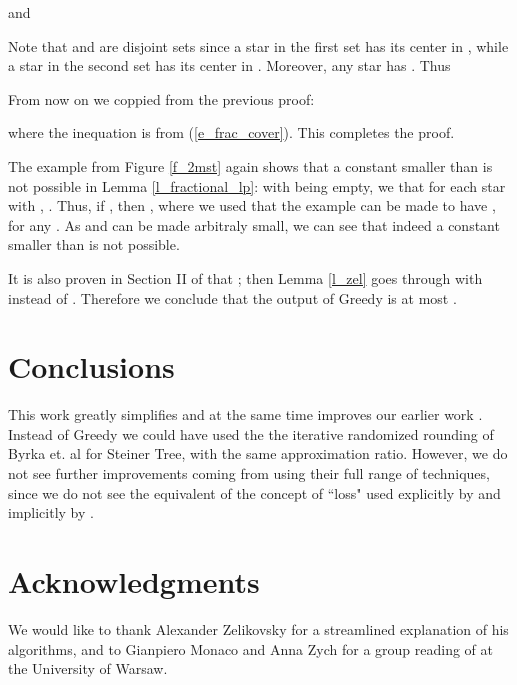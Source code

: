 \documentclass[12pt]{article}
\def\qed{ \ \vrule width.2cm height.2cm depth0cm\smallskip}
\begin{document}
and

Note that  and  
are disjoint sets since a star in the first set has
its center in , while
a star in the second set has its center in .
Moreover, any star 
has . Thus

 
From now on we coppied from the previous proof:

where the inequation is from (\ref{e_frac_cover}).
This completes the proof.
\qed

The example from Figure \ref{f_2mst} again shows that a constant
smaller than  is not possible in Lemma \ref{l_fractional_lp}:
with  being empty, we that for each star 
with , .
Thus, if , then  
,
where we used that the example can be made to have 
, for any .
As  and  can be made arbitraly small,
we can see that indeed a constant smaller than  is not possible.


It is also proven in Section II of \cite{CQ12} that ;
then Lemma \ref{l_zel} goes through with  instead of .
Therefore we conclude that the output of Greedy is at most .

\section{Conclusions}

This work greatly simplifies and at the same time improves our 
earlier work \cite{C10}.
Instead of Greedy we could have used the 
the iterative randomized rounding of
 Byrka et. al \cite{BGRS10} for Steiner Tree,
with the same approximation ratio.
However, we do not see further improvements coming from
using their full range of techniques,
 since we do not see the equivalent of the concept of ``loss"
used explicitly by \cite{RZ00} and implicitly by  \cite{BGRS10}.

\section{Acknowledgments}

We would like to thank Alexander Zelikovsky for a streamlined explanation
of his algorithms,
and to Gianpiero Monaco and Anna Zych for a group reading of \cite{BGRS10}
at the University of Warsaw.
\end{document}
